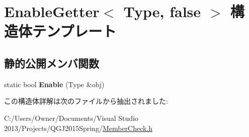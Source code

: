 \hypertarget{struct_enable_getter_3_01_type_00_01false_01_4}{}\section{Enable\+Getter$<$ Type, false $>$ 構造体テンプレート}
\label{struct_enable_getter_3_01_type_00_01false_01_4}
\subsection*{静的公開メンバ関数}
\begin{DoxyCompactItemize}
\item 
static bool {\bfseries Enable} (Type \&obj)\hypertarget{struct_enable_getter_3_01_type_00_01false_01_4_a773db2ad3d3fca54dfc134b51dd7d83a}{}\label{struct_enable_getter_3_01_type_00_01false_01_4_a773db2ad3d3fca54dfc134b51dd7d83a}

\end{DoxyCompactItemize}


この構造体詳解は次のファイルから抽出されました\+:\begin{DoxyCompactItemize}
\item 
C\+:/\+Users/\+Owner/\+Documents/\+Visual Studio 2013/\+Projects/\+Q\+G\+J2015\+Spring/\hyperlink{_member_check_8h}{Member\+Check.\+h}\end{DoxyCompactItemize}
